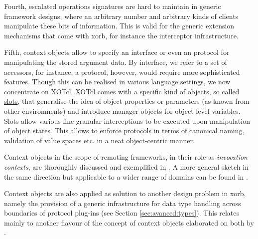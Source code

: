 Fourth, escalated operations signatures are hard to maintain in generic framework designs, where an arbitrary number and arbitrary kinds of clients manipulate these bits of information. This is valid for the generic extension mechanisms that come with xorb, for instance the interceptor infrastructure.

Fifth, context objects allow to specify an interface or even an protocol for manipulating the stored argument data. By interface, we refer to a set of accessors, for instance, a protocol, however, would require more sophisticated features. Though this can be realised in various language settings, we now concentrate on XOTcl. XOTcl comes with a specific kind of objects, so called \href{http://media.wu-wien.ac.at/doc/tutorial.html#slots}{slots}, that generalise the idea of object properties or parameters (as known from other environments) and introduce manager objects for object-level variables. Slots allow various fine-granular interceptions to be executed upon manipulation of object states. This allows to enforce protocols in terms of canonical naming, validation of value spaces etc. in a neat object-centric manner.

Context objects in the scope of remoting frameworks, in their role as \emph{invocation contexts}, are thoroughly discussed and exemplified in \cite{zdun:2005}. A more general sketch in the same direction but applicable to a wider range of domains can be found in \cite{kelly:2003}.

Context objects are also applied as solution to another design problem in xorb, namely the provision of a generic infrastructure for data type handling across boundaries of protocol plug-ins (see Section \ref{sec:avanced:types}). This relates mainly to another flavour of the concept of context objects elaborated on both by \cite{maetzel:1996,sommerlad:1998}. 
  
